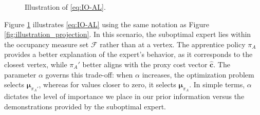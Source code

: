 \documentclass[10pt]{article} %
\def\vc{{\bm{c}}}
\def\vmu{{\bm{\mu}}}
\begin{document}
\begin{figure}[ht]
    \centering
    \caption{Illustration of \eqref{eq:IO-AL}.}
    \label{fig:illustration_IOAL}
\end{figure}

Figure \ref{fig:illustration_IOAL} illustrates \eqref{eq:IO-AL} using the same notation as Figure \ref{fig:illustration_projection}. In this scenario, the suboptimal expert lies within the occupancy measure set $\mathcal{F}$ rather than at a vertex. The apprentice policy $\pi_A$ provides a better explanation of the expert's behavior, as it corresponds to the closest vertex, while $\pi_A'$ better aligns with the proxy cost vector $\hat{\vc}$. The parameter $\alpha$ governs this trade-off: when $\alpha$ increases, the optimization problem selects $\vmu_{\pi_A'}$, whereas for values closer to zero, it selects $\vmu_{\pi_A}$. In simple terms, $\alpha$ dictates the level of importance we place in our prior information versus the demonstrations provided by the suboptimal expert. \par
\end{document}
